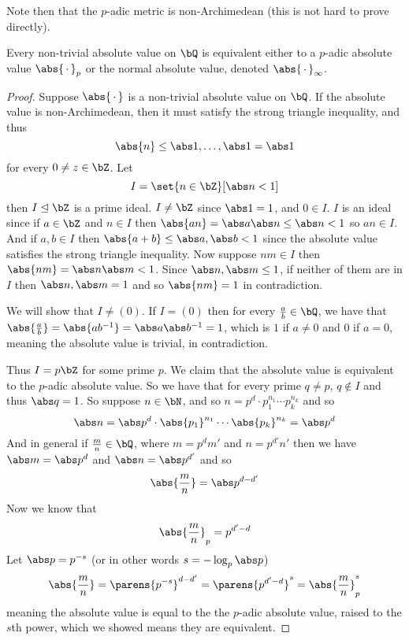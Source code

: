 \documentclass[10pt]{article}
\let\ideal=\trianglelefteq
\begin{document}
Note then that the $p$-adic metric is non-Archimedean (this is not hard to prove directly).

\begin{thrm*}

    Every non-trivial absolute value on $\bQ$ is equivalent either to a $p$-adic absolute value $\abs{\,\cdot\,}_p$ or the normal absolute value, denoted $\abs{\,\cdot\,}_\infty$.

\end{thrm*}

\begin{proof}

    Suppose $\abs{\,\cdot\,}$ is a non-trivial absolute value on $\bQ$.
    If the absolute value is non-Archimedean, then it must satisfy the strong triangle inequality, and thus
    \[ \abs{n} \leq \maxof{\abs1,\dots,\abs1} = \abs 1 \]
    for every $0\neq z\in\bZ$.
    Let
    \[ I = \set{n\in\bZ}[\abs n<1] \]
    then $I\ideal\bZ$ is a prime ideal.
    $I\neq\bZ$ since $\abs1=1$, and $0\in I$.
    $I$ is an ideal since if $a\in\bZ$ and $n\in I$ then $\abs{an}=\abs a\abs n\leq\abs n<1$ so $an\in I$.
    And if $a,b\in I$ then $\abs{a+b}\leq\maxof{\abs a,\abs b}<1$ since the absolute value satisfies the strong triangle inequality.
    Now suppose $nm\in I$ then $\abs{nm}=\abs n\abs m<1$.
    Since $\abs n,\abs m\leq 1$, if neither of them are in $I$ then $\abs n,\abs m=1$ and so $\abs{nm}=1$ in contradiction.

    We will show that $I\neq(0)$.
    If $I=(0)$ then for every $\frac ab\in\bQ$, we have that $\abs{\frac ab}=\abs{ab^{-1}}=\abs a\abs b^{-1}=1$, which is $1$ if $a\neq0$ and $0$ if $a=0$, meaning the absolute value is trivial, in
    contradiction.

    Thus $I=p\bZ$ for some prime $p$.
    We claim that the absolute value is equivalent to the $p$-adic absolute value.
    So we have that for every prime $q\neq p$, $q\notin I$ and thus $\abs q=1$.
    So suppose $n\in\bN$, and so $n=p^d\cdot p_1^{n_1}\cdots p_k^{n_k}$ and so
    \[ \abs n = \abs p^d\cdot\abs{p_1}^{n_1}\cdots\abs{p_k}^{n_k} = \abs p^d \]
    And in general if $\frac mn\in\bQ$, where $m=p^dm'$ and $n=p^{d'}n'$ then we have $\abs m=\abs p^d$ and $\abs n=\abs p^{d'}$ and so
    \[ \abs{\frac mn} = \abs p^{d-d'} \]
    Now we know that
    \[ \abs{\frac mn}_p = p^{d'-d} \]
    Let $\abs p=p^{-s}$ (or in other words $s=-\log_p\abs p$)
    \[ \abs{\frac mn} = \parens{p^{-s}}^{d-d'} = \parens{p^{d'-d}}^s = \abs{\frac mn}_p^s \]
    meaning the absolute value is equal to the the $p$-adic absolute value, raised to the $s$th power, which we showed means they are equivalent.

\end{proof}
\end{document}
